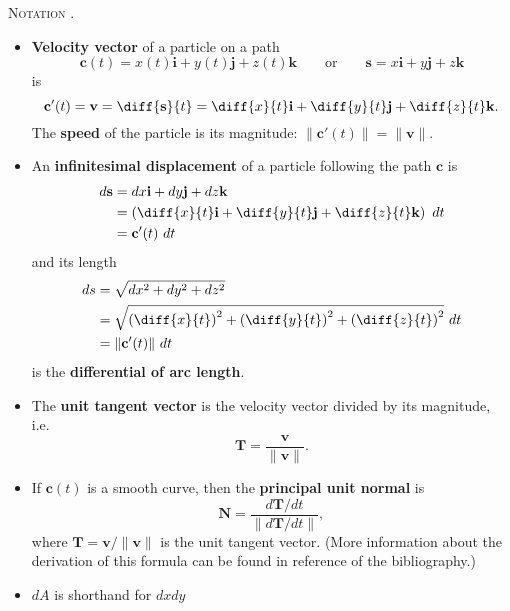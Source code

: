 \textsc{Notation \cite{marsden_vector_calculus} \cite{thomas_calculus}.}
\begin{itemize}
	\item \textbf{Velocity vector} of a particle on a path
	$$\mathbf{c}(t) = x(t) \mathbf{i} + y(t) \mathbf{j} + z(t) \mathbf{k} \qquad \text{or} \qquad \mathbf{s} = x \mathbf{i} + y \mathbf{j} + z \mathbf{k} $$
is
$$ \mathbf{c}'(t) = \mathbf{v} = \diff{\mathbf{s}}{t} = \diff{x}{t} \mathbf{i} + \diff{y}{t} \mathbf{j} + \diff{z}{t} \mathbf{k} . $$
The \textbf{speed} of the particle is its magnitude: $\lVert \mathbf{c}'(t) \rVert = \lVert \mathbf{v} \rVert$.
	\item An \textbf{infinitesimal displacement} of a particle following the path $\mathbf{c}$ is
\begin{align*}
d \mathbf{s} &= dx \mathbf{i} + dy \mathbf{j} + dz \mathbf{k} \\
&= \left( \diff{x}{t} \mathbf{i} + \diff{y}{t} \mathbf{j} + \diff{z}{t} \mathbf{k} \right) \ dt \\
&= \mathbf{c}'(t) \ dt
\end{align*}
and its length
\begin{align*}
ds &= \sqrt{dx^2 + dy^2 + dz^2} \\
&= \sqrt{\left(\diff{x}{t}\right)^2 + \left(\diff{y}{t}\right)^2 + \left(\diff{z}{t}\right)^2} \ dt \\
&= \lVert \mathbf{c}'(t) \rVert \ dt
\end{align*}
is the \textbf{differential of arc length}.
	\item The \textbf{unit tangent vector} is the velocity vector divided by its magnitude, i.e.
$$ \mathbf{T} = \frac{\mathbf{v}}{\lVert \mathbf{v} \rVert} . $$
	\item If $\mathbf{c}(t)$ is a smooth curve, then the \textbf{principal unit normal} is
$$ \mathbf{N} = \frac{d\mathbf{T} / dt}{\lVert d\mathbf{T} / dt \rVert} , $$
where $\mathbf{T} = \mathbf{v} / \lVert \mathbf{v} \rVert$ is the unit tangent vector. (More information about the derivation of this formula can be found in reference \cite{thomas_calculus} of the bibliography.)
	\item $dA$ is shorthand for $dx dy$
\end{itemize}

